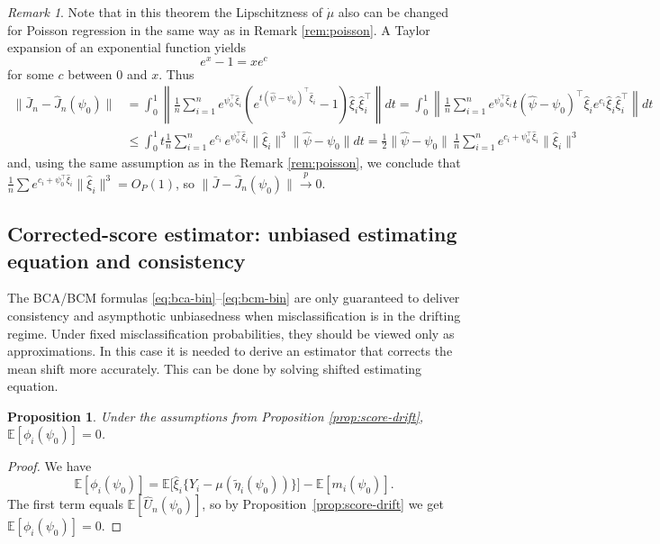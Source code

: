 \documentclass[11pt]{article}
\newtheorem{proposition}{Proposition}
\theoremstyle{definition}
\theoremstyle{remark}
\newtheorem{remark}{Remark}
\newcommand{\E}{\mathbb{E}}
\newcommand{\toP}{\xrightarrow{\,p\,}}
\begin{document}
\begin{remark}
    Note that in this theorem the Lipschitzness of $\dot\mu$ also can be changed for Poisson regression in the same way as in Remark \ref{rem:poisson}. A Taylor expansion of an exponential function yields
    \[ e^x - 1 = xe^c \]
    for some $c$ between 0 and $x$. Thus
    \[\begin{split}
    \| \bar J_n-\hat J_n(\psi_0)\| & = \int_0^1 \left\| \frac{1}{n}\sum_{i=1}^n e^{\psi_0^\top \hat\xi_i} (e^{t(\hat\psi - \psi_0)^\top\hat\xi_i}-1) \hat\xi_i\hat\xi_i^\top \right\|dt = \int_0^1 \left\| \frac{1}{n}\sum_{i=1}^n e^{\psi_0^\top \hat\xi_i} t(\hat\psi - \psi_0)^\top\hat\xi_i e ^{c_i} \hat\xi_i\hat\xi_i^\top \right\|dt \\
    &\leq \int_0^1 t \frac{1}{n}\sum_{i=1}^n e^{c_i}\, e^{\psi_0^\top\hat\xi_i}\|\hat\xi_i\|^3 \|\hat\psi-\psi_0 \| dt = \frac{1}{2} \|\hat\psi - \psi_0\|\, \frac{1}{n}\sum_{i=1}^ne^{c_i+\psi_0^\top \hat\xi_i}\|\hat\xi_i\|^3
    \end{split} \]
    and, using the same assumption as in the Remark \ref{rem:poisson}, we conclude that $\frac{1}{n}\sum e^{c_i+\psi_0^\top \hat\xi_i}\|\hat\xi_i\|^3 = O_P(1)$, so $\|\bar J - \hat J_n (\psi_0)\| \toP 0.$
\end{remark}

\subsection{Corrected-score estimator: unbiased estimating equation and consistency}

The BCA/BCM formulas \eqref{eq:bca-bin}--\eqref{eq:bcm-bin} are only guaranteed to deliver
consistency and asympthotic unbiasedness when misclassification is in the drifting regime. Under fixed
misclassification probabilities, they should be viewed only as approximations. In this case it is needed to derive an estimator that corrects the mean shift more accurately. This can be done by solving shifted estimating equation.

\begin{proposition}\label{prop:cs-unbiased}
Under the assumptions from Proposition \ref{prop:score-drift}, $\E[\phi_i(\psi_0)]=0$.
\end{proposition}

\begin{proof}
We have
\[\E[\phi_i(\psi_0)]=\E\big[\hat\xi_i\{Y_i-\mu(\tilde\eta_i(\psi_0))\}\big]-\E[m_i(\psi_0)].\]
The first term equals $\E[\hat U_n(\psi_0)]$, so by Proposition~\ref{prop:score-drift} we get $\E[\phi_i(\psi_0)]=0$.
\end{proof}
\end{document}
